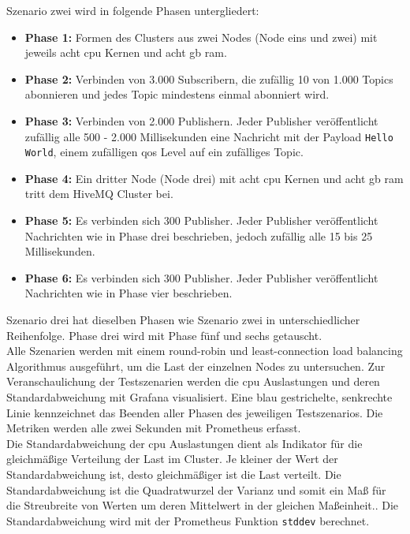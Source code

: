 Szenario zwei wird in folgende Phasen untergliedert:
\begin{itemize}
  \item \textbf{Phase 1:} Formen des Clusters aus zwei Nodes (Node eins und zwei) mit jeweils acht \ac{cpu} Kernen und acht \ac{gb} \ac{ram}.
  \item \textbf{Phase 2:} Verbinden von 3.000 Subscribern, die zufällig 10 von 1.000 Topics abonnieren und jedes Topic mindestens einmal abonniert wird.
  \item \textbf{Phase 3:} Verbinden von 2.000 Publishern. Jeder Publisher veröffentlicht zufällig alle 500 - 2.000 Millisekunden eine Nachricht mit der Payload \verb|Hello World|, einem zufälligen \ac{qos} Level auf ein zufälliges Topic.
  \item \textbf{Phase 4:} Ein dritter Node (Node drei) mit acht \ac{cpu} Kernen und acht \ac{gb} \ac{ram} tritt dem HiveMQ Cluster bei.
  \item \textbf{Phase 5:} Es verbinden sich 300 Publisher. Jeder Publisher veröffentlicht Nachrichten wie in Phase drei beschrieben, jedoch zufällig alle 15 bis 25 Millisekunden.
  \item \textbf{Phase 6:} Es verbinden sich 300 Publisher. Jeder Publisher veröffentlicht Nachrichten wie in Phase vier beschrieben.
\end{itemize}
Szenario drei hat dieselben Phasen wie Szenario zwei in unterschiedlicher Reihenfolge. Phase drei wird mit Phase fünf und sechs getauscht.
\\
Alle Szenarien werden mit einem round-robin und least-connection load balancing Algorithmus ausgeführt, um die Last der einzelnen Nodes zu untersuchen.
Zur Veranschaulichung der Testszenarien werden die \ac{cpu} Auslastungen und deren Standardabweichung mit Grafana visualisiert. Eine blau gestrichelte, senkrechte Linie kennzeichnet das Beenden aller Phasen des jeweiligen Testszenarios. Die Metriken werden alle zwei Sekunden mit Prometheus erfasst.
\\
Die Standardabweichung der \ac{cpu} Auslastungen dient als Indikator für die gleichmä{\ss}ige Verteilung der Last im Cluster. Je kleiner der Wert der Standardabweichung ist, desto gleichmä{\ss}iger ist die Last verteilt.
Die Standardabweichung ist die Quadratwurzel der Varianz und somit ein Ma{\ss} für die Streubreite von Werten um deren Mittelwert in der gleichen Ma{\ss}einheit.\cite[S.~72]{buchterElementareStochastikEinfuhrung2005}. Die Standardabweichung wird mit der Prometheus Funktion \verb|stddev| berechnet.
\newpage

